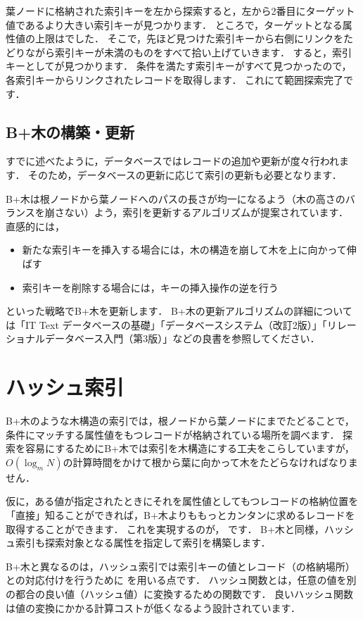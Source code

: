 葉ノードに格納された索引キーを左から探索すると，左から2番目にターゲット値であるより大きい索引キーが見つかります．
ところで，ターゲットとなる属性値の上限はでした．
そこで，先ほど見つけた索引キーから右側にリンクをたどりながら索引キーが未満のものをすべて拾い上げていきます．
すると，索引キーとしてが見つかります．
条件を満たす索引キーがすべて見つかったので，各索引キーからリンクされたレコードを取得します．
これにて範囲探索完了です．


\subsection{B+木の構築・更新}
すでに述べたように，データベースではレコードの追加や更新が度々行われます．
そのため，データベースの更新に応じて索引の更新も必要となります．

B+木は根ノードから葉ノードへのパスの長さが均一になるよう（木の高さのバランスを崩さない）よう，索引を更新するアルゴリズムが提案されています．
直感的には，
\begin{itemize}
\item 新たな索引キーを挿入する場合には，木の構造を崩して木を上に向かって伸ばす
\item 索引キーを削除する場合には，キーの挿入操作の逆を行う
\end{itemize}
といった戦略でB+木を更新します．
B+木の更新アルゴリズムの詳細については「IT Text データベースの基礎\cite{吉川本}」「データベースシステム（改訂2版）\cite{北川本}」「リレーショナルデータベース入門（第3版）\cite{増永本}」などの良書を参照してください．


\section{ハッシュ索引}
B+木のような木構造の索引では，根ノードから葉ノードにまでたどることで，条件にマッチする属性値をもつレコードが格納されている場所を調べます．
探索を容易にするためにB+木では索引を木構造にする工夫をこらしていますが，$O(\log_m{N})$の計算時間をかけて根から葉に向かって木をたどらなければなりません．

仮に，ある値が指定されたときにそれを属性値としてもつレコードの格納位置を「直接」知ることができれば，B+木よりももっとカンタンに求めるレコードを取得することができます．
これを実現するのが， です\cite{Fagin1979, Litwin1980}．
B+木と同様，ハッシュ索引も探索対象となる属性を指定して索引を構築します．

B+木と異なるのは，ハッシュ索引では索引キーの値とレコード（の格納場所）との対応付けを行うために を用いる点です．
ハッシュ関数とは，任意の値を別の都合の良い値（ハッシュ値）に変換するための関数です．
良いハッシュ関数は値の変換にかかる計算コストが低くなるよう設計されています．

